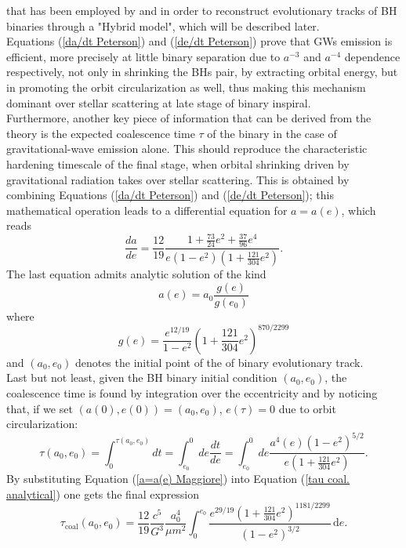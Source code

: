 \documentclass[12pt,twoside,openany]{book}
\begin{document}
that has been employed by \textcite{Quinlan_1996} and \textcite{Sesana_2010} in order to reconstruct evolutionary tracks of BH binaries through a "Hybrid model", which will be described later.\\Equations (\ref{da/dt Peterson}) and (\ref{de/dt Peterson}) prove that GWs emission  is efficient, more precisely at little binary separation due to $a^{-3}$ and $a^{-4}$ dependence respectively, not only in shrinking the BHs pair, by extracting orbital energy, but in promoting the orbit circularization as well, thus making this mechanism dominant over stellar scattering at late stage of binary inspiral.\\Furthermore, another key piece of information that can be derived from the theory is the expected coalescence time $\tau$ of the binary in the case of gravitational-wave emission alone. This should reproduce the characteristic hardening timescale of the final stage, when orbital shrinking driven by gravitational radiation takes over stellar scattering. This is obtained by combining Equations (\ref{da/dt Peterson}) and (\ref{de/dt Peterson}); this mathematical operation leads to a differential equation for $a=a(e)$, which reads
\begin{equation}\label{da/de Maggiore}
    \frac{da}{de}=\frac{12}{19}\frac{1+\frac{73}{24}e^2+\frac{37}{96}e^4}{e(1-e^2)\left(1+\frac{121}{304}e^2\right)}.
\end{equation}
The last equation admits analytic solution of the kind
\begin{equation}\label{a=a(e) Maggiore}
    a(e)=a_0\frac{g(e)}{g(e_0)}
\end{equation}
where 
\begin{equation}\label{g(e) Maggiore}
    g(e)=\frac{e^{12/19}}{1-e^2}\left(1+\frac{121}{304}e^2\right)^{870/2299}
\end{equation}
and $(a_0,e_0)$ denotes the initial point of the of binary evolutionary track.\\Last but not least, given the BH binary initial condition $(a_0,e_0)$, the coalescence time is found by integration over the eccentricity and by noticing that, if we set $(a(0),e(0))=(a_0,e_0)$, $e(\tau)=0$ due to orbit circularization:
\begin{equation}\label{tau coal. analytical}
\tau(a_0,e_0)=\int_0^{\tau(a_0,e_0)}dt=\int_{e_0}^{0}de \frac{dt}{de}=\int_{e_0}^{0}de \frac{a^4(e)(1-e^2)^{5/2}}{e\left(1+\frac{121}{304}e^2\right)}.
\end{equation}
By substituting Equation (\ref{a=a(e) Maggiore}) into Equation (\ref{tau coal. analytical}) one gets the final expression
\begin{equation}\label{t_coal Maggiore} 
\tau_{\mathrm{coal}}(a_0,e_0)
=
\frac{12}{19}
\frac{c^5}{G^3}
\frac{a_0^4}{\mu m^2}
\int_{0}^{e_0}
\frac{e^{29/19}
\left(1+\frac{121}{304}e^2\right)^{1181/2299}}
{(1-e^2)^{3/2}}
\,\mathrm{d}e.
\end{equation}
\end{document}
